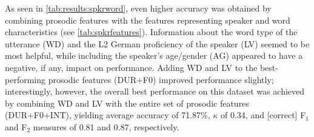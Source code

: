 \documentclass[a4paper]{article}
\begin{document}
		
		
	
		
	
		As seen in \cref{tab:results:spkrword}, even higher accuracy was obtained by combining prosodic features with the features representing speaker and word characteristics (see \cref{tab:spkrfeatures}). Information about the word type of the utterance (WD) and the L2 German proficiency of the speaker (LV) %
		 seemed to be most helpful, while including the speaker's age/gender (AG) appeared to have a negative, if any, impact on performance. 
		Adding WD and LV to the best-performing prosodic features (DUR+F0) improved performance slightly; %
		 interestingly, however, the overall best performance on this dataset was achieved by combining WD and LV with the entire set of prosodic features (DUR+F0+INT), yielding average accuracy of 71.87\%, $\kappa$ of 0.34, and [correct] F$_1$ and F$_2$ measures of 0.81 and 0.87, respectively.
\end{document}
